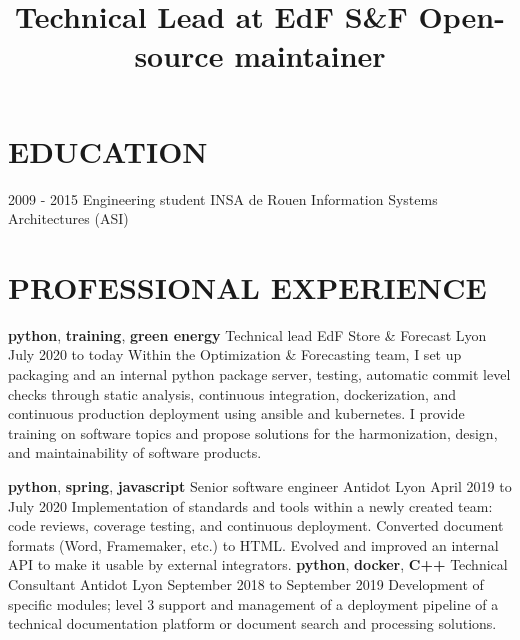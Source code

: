 \documentclass[11pt,a4paper]{moderncv}
\title{
  Technical Lead at EdF S\&F \newline{}
  Open-source maintainer
}
\begin{document}
  \maketitle
  \vspace*{-5mm}
  \section{EDUCATION}

  \cventry
    {2009 - 2015}
    {Engineering student}
    {INSA de Rouen}
    {Information Systems Architectures (ASI)}
	{}{}



  \section{PROFESSIONAL EXPERIENCE}
  \label{sec:professional-experience}

  \cventry
    {\textbf{python}, \textbf{training}, \textbf{green energy}}
    {Technical lead}
    {EdF Store \& Forecast}
    {Lyon}
    {July 2020 to today}{
      Within the Optimization \& Forecasting team, I set up packaging and an
      internal python package server, testing, automatic commit level checks
      through static analysis, continuous integration, dockerization, and
      continuous production deployment using ansible and kubernetes. I provide
      training on software topics and propose solutions for the harmonization,
      design, and maintainability of software products.
    }

  \cventry
    {\textbf{python}, \textbf{spring}, \textbf{javascript}}
    {Senior software engineer}
    {Antidot}
    {Lyon}
    {April 2019 to July 2020}{
      Implementation of standards and tools within a newly created team: code reviews,
      coverage testing, and continuous deployment. Converted document formats (Word, Framemaker, etc.) to
      HTML. Evolved and improved an internal API to make it usable by external integrators.
    }
  \cventry
    {\textbf{python}, \textbf{docker}, \textbf{C++}}
    {Technical Consultant}
    {Antidot}
    {Lyon}
    {September 2018 to September 2019}{
        Development of specific modules; level 3 support and management of a deployment pipeline
        of a technical documentation platform or document search and processing solutions.
    }
\end{document}
